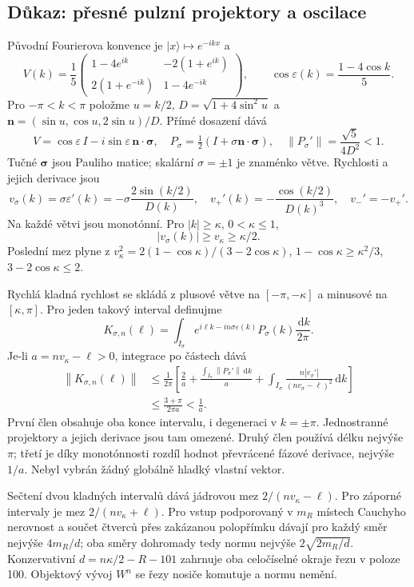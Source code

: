 \documentclass[11pt,a4paper]{article}
\newcommand{\norm}[1]{\left\lVert#1\right\rVert}
\newcommand{\dd}{\,\mathrm d}
\newcommand{\eps}{\varepsilon}
\theoremstyle{remark}\newtheorem{remark}[theorem]{Poznámka}
\numberwithin{equation}{section}
\begin{document}
\subsection{Důkaz: přesné pulzní projektory a oscilace}

Původní Fourierova konvence je \(|x\rangle\mapsto e^{-ikx}\) a
\[
V(k)=\frac15\begin{pmatrix}
1-4e^{ik}&-2(1+e^{ik})\\2(1+e^{-ik})&1-4e^{-ik}
\end{pmatrix},\qquad
\cos\eps(k)=\frac{1-4\cos k}{5}.
\]
Pro \(-\pi<k<\pi\) položme \(u=k/2\),
\(D=\sqrt{1+4\sin^2u}\) a
\(\boldsymbol n=(\sin u,\cos u,2\sin u)/D\). Přímé dosazení dává
\[
V=\cos\eps\,I-i\sin\eps\,\boldsymbol n\cdot\boldsymbol\sigma,
\quad P_\sigma=\tfrac12(I+\sigma\boldsymbol n\cdot\boldsymbol\sigma),
\quad \norm{P_\sigma'}=\frac{\sqrt5}{4D^2}<1.
\]
Tučné \(\boldsymbol\sigma\) jsou Pauliho matice; skalární \(\sigma=\pm1\) je znaménko větve. Rychlosti a jejich derivace jsou
\[
v_\sigma(k)=\sigma\eps'(k)=-\sigma\frac{2\sin(k/2)}{D(k)},\quad
v_+'(k)=-\frac{\cos(k/2)}{D(k)^3},\quad v_-'=-v_+'.
\]
Na každé větvi jsou monotónní. Pro \(|k|\ge\kappa\), \(0<\kappa\le1\),
\[
|v_\sigma(k)|\ge v_\kappa\ge\kappa/2.
\]
Poslední mez plyne z
\(v_\kappa^2=2(1-\cos\kappa)/(3-2\cos\kappa)\),
\(1-\cos\kappa\ge\kappa^2/3\), \(3-2\cos\kappa\le2\).

Rychlá kladná rychlost se skládá z plusové větve na \([-\pi,-\kappa]\) a minusové na \([\kappa,\pi]\). Pro jeden takový interval definujme
\[
K_{\sigma,n}(\ell)=\int_{I_\sigma}
e^{i\ell k-in\sigma\eps(k)}P_\sigma(k)\frac{\dd k}{2\pi}.
\]
Je-li \(a=n v_\kappa-\ell>0\), integrace po částech dává
\begin{align*}
\norm{K_{\sigma,n}(\ell)}
&\le\frac1{2\pi}\left[
\frac2a+\frac{\int_{I_\sigma}\norm{P_\sigma'}\dd k}{a}
+\int_{I_\sigma}\frac{n|v_\sigma'|}{(nv_\sigma-\ell)^2}\dd k\right]\\
&\le\frac{3+\pi}{2\pi a}<\frac1a.
\end{align*}
První člen obsahuje oba konce intervalu, i degeneraci v \(k=\pm\pi\). Jednostranné projektory a jejich derivace jsou tam omezené. Druhý člen používá délku nejvýše \(\pi\); třetí je díky monotónnosti rozdíl hodnot převrácené fázové derivace, nejvýše \(1/a\). Nebyl vybrán žádný globálně hladký vlastní vektor.

Sečtení dvou kladných intervalů dává jádrovou mez \(2/(n v_\kappa-\ell)\). Pro záporné intervaly je mez \(2/(n v_\kappa+\ell)\). Pro vstup podporovaný v \(m_R\) místech Cauchyho nerovnost a součet čtverců přes zakázanou polopřímku dávají pro každý směr nejvýše \(4m_R/d\); oba směry dohromady tedy normu nejvýše \(2\sqrt{2m_R/d}\). Konzervativní \(d=n\kappa/2-R-101\) zahrnuje oba celočíselné okraje řezu v poloze 100. Objektový vývoj \(W^n\) se řezy nosiče komutuje a normu nemění.
\end{document}

